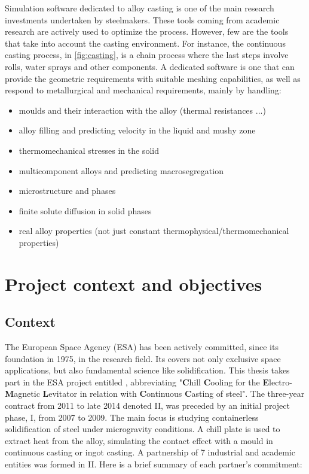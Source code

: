 Simulation software dedicated to alloy casting is one of the main research investments undertaken by steelmakers. 
These tools coming from academic research
are actively used to optimize the process. 
However, few are the tools that take into account the casting environment. 
For instance, the continuous casting process, in
\cref{fig:casting}, is a chain process where the last steps involve rolls, water sprays and other components. 
A dedicated software is one that can provide the geometric requirements with suitable meshing capabilities, 
as well as respond to metallurgical and mechanical requirements, mainly by handling:
%
\begin{itemize}
\itemsep0em
\item moulds and their interaction with the alloy (thermal resistances ...)
\item alloy filling and predicting velocity in the liquid and mushy zone
\item thermomechanical stresses in the solid
\item multicomponent alloys and predicting macrosegregation
\item microstructure and phases
\item finite solute diffusion in solid phases
\item real alloy properties (not just constant thermophysical/thermomechanical properties)
\end{itemize}
%
%
\section{Project context and objectives}
%
\subsection{Context}
The European Space Agency (ESA) has been actively committed, since its foundation in 1975, in the research field.
Its covers not only exclusive space applications, but also fundamental science like solidification. 
This thesis takes part in the ESA project entitled \ccemlcc, abbreviating
"\textbf{C}hill \textbf{C}ooling for the \textbf{E}lectro-\textbf{M}agnetic \textbf{L}evitator in relation with 
\textbf{C}ontinuous \textbf{C}asting of steel".
The three-year contract from 2011 to late 2014 denoted \ccemlcc II, was preceded by an initial project phase, \ccemlcc I,
from 2007 to 2009. The main focus is studying containerless solidification of steel under microgravity conditions. 
A chill plate is used to extract heat from the alloy, simulating the contact effect with a mould in continuous casting
or ingot casting.
A partnership of 7 industrial and academic entities was formed in \ccemlcc II. 
Here is a brief summary of each partner's commitment:\\

